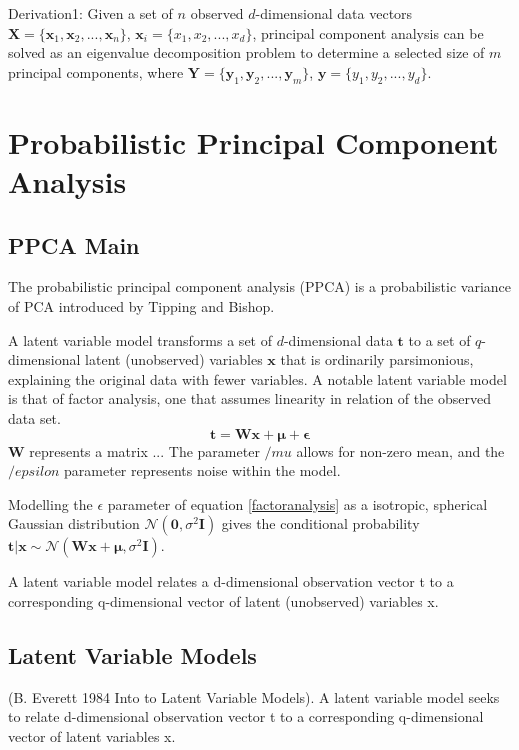 \documentclass[ %
                    author={Dillon Keith Diep},
                supervisor={Dr. Carl Henrik Ek},
                    degree={MEng},
                     title={Assisted Content Generation for 3D Hair Geometry},
                  subtitle={[INCOMPLETE DRAFT, CONTAINS NOTES FROM RESEARCH]},
                      type={Research},
                      year={2014} ]{dissertation}
\begin{document}
Derivation1:
Given a set of $n$ observed $d$-dimensional data vectors $\mathbf{X}=\{\mathbf{x}_1,\mathbf{x}_2,...,\mathbf{x}_n\}$, $\mathbf{x}_i = \{x_1,x_2,...,x_d\}$, principal component analysis can be solved as an eigenvalue decomposition problem to determine a selected size of $m$ principal components, where $\mathbf{Y}=\{\mathbf{y}_1,\mathbf{y}_2,...,\mathbf{y}_m\}$, $\mathbf{y}=\{y_1,y_2,...,y_d\}$. 

\section{Probabilistic Principal Component Analysis}

\subsection{PPCA Main}
The probabilistic principal component analysis (PPCA) is a probabilistic variance of PCA introduced by Tipping and Bishop\cite{PPCA}. 

A latent variable model transforms a set of $d$-dimensional data $\mathbf{t}$ to a set of $q$-dimensional latent (unobserved) variables $\mathbf{x}$ that is ordinarily parsimonious, explaining the original data with fewer variables. A notable latent variable model is that of factor analysis, one that assumes linearity in relation of the observed data set.
\begin{equation} \label{factoranalysis}
	\mathbf{t=Wx+\mu+\epsilon}
\end{equation}
$\mathbf{W}$ represents a matrix ...
The parameter $/mu$ allows for non-zero mean, and the $/epsilon$ parameter represents noise within the model.

Modelling the $\epsilon$ parameter of equation \ref{factoranalysis} as a isotropic, spherical Gaussian distribution $\mathcal{N}(\mathbf{0},\sigma^2\mathbf{I})$ gives the conditional probability $\mathbf{t|x}\sim\mathcal{N}(\mathbf{Wx+\mu},\sigma^2\mathbf{I})$. 



A latent variable model relates a d-dimensional observation vector t to a corresponding q-dimensional vector of latent (unobserved) variables x.

\subsection{Latent Variable Models}
(B. Everett 1984 Into to Latent Variable Models).	
A latent variable model seeks to relate d-dimensional observation vector t to a corresponding q-dimensional vector of latent variables x.
\end{document}
